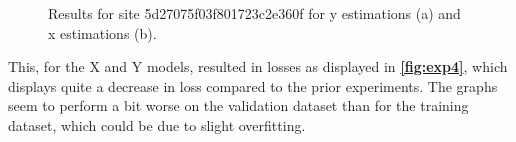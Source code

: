 \begin{figure}[H]
\centering
  \hfill
  \caption{Results for site 5d27075f03f801723c2e360f for y estimations (a) and x estimations (b).}
  \label{fig:exp4}
\end{figure}

This, for the X and Y models, resulted in losses as displayed in \textbf{\autoref{fig:exp4}}, which displays quite a decrease in loss compared to the prior experiments. The graphs seem to perform a bit worse on the validation dataset than for the training dataset, which could be due to slight overfitting.

